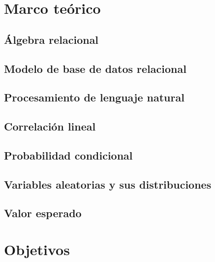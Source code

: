 \documentclass[12pt,letterpaper]{article}
\begin{document}
%
\tableofcontents
\pagebreak
\section {Marco teórico}\label{sec:marcot}
\subsection {Álgebra relacional}\label{subsec:algebra}
\subsection {Modelo de base de datos relacional}\label{subsch:rdb}
\subsection {Procesamiento de lenguaje natural}\label{subsec:nlp}
\subsection {Correlación lineal}\label{subsec:corrl}
\subsection {Probabilidad condicional}\label{subsec:pcond}
\subsection {Variables aleatorias y sus distribuciones}\label{subsec:vayd}
\subsection {Valor esperado}\label{subsec:valesp}
\section {Objetivos}\label{sec:objetivos}
\end{document}

